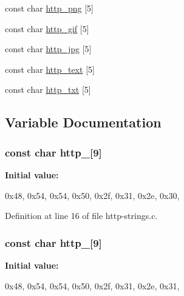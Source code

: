 \begin{DoxyCompactItemize}
const char \hyperlink{http-strings_8c_a2d5a64e8568607133bdf64f53ab719e6}{http\_\-png} \mbox{[}5\mbox{]}
\item 
const char \hyperlink{http-strings_8c_a21f4d6b0759786044bce910d140df3b7}{http\_\-gif} \mbox{[}5\mbox{]}
\item 
const char \hyperlink{http-strings_8c_acecfa49a95be67df62b2421efe1d5be3}{http\_\-jpg} \mbox{[}5\mbox{]}
\item 
const char \hyperlink{http-strings_8c_a03afa2e3239d727db67e1d943268bfbe}{http\_\-text} \mbox{[}5\mbox{]}
\item 
const char \hyperlink{http-strings_8c_a4f366bfe5aadc430314df6368294c385}{http\_\-txt} \mbox{[}5\mbox{]}
\end{DoxyCompactItemize}


\subsection{Variable Documentation}
\hypertarget{http-strings_8c_a53c130cd156bfd5adeb5f7e4cc5967e4}{
\subsubsection[{http\_\-10}]{\setlength{\rightskip}{0pt plus 5cm}const char {\bf http\_}\mbox{[}9\mbox{]}}}
\label{http-strings_8c_a53c130cd156bfd5adeb5f7e4cc5967e4}
{\bfseries Initial value:}
\begin{DoxyCode}
 

{0x48, 0x54, 0x54, 0x50, 0x2f, 0x31, 0x2e, 0x30, }
\end{DoxyCode}


Definition at line 16 of file http-\/strings.c.

\hypertarget{http-strings_8c_a9bc6680c526e8354582bb9f71c50710f}{
\subsubsection[{http\_\-11}]{\setlength{\rightskip}{0pt plus 5cm}const char {\bf http\_}\mbox{[}9\mbox{]}}}
\label{http-strings_8c_a9bc6680c526e8354582bb9f71c50710f}
{\bfseries Initial value:}
\begin{DoxyCode}
 

{0x48, 0x54, 0x54, 0x50, 0x2f, 0x31, 0x2e, 0x31, }
\end{DoxyCode}


